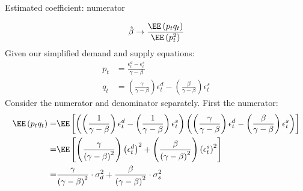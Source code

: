 \documentclass[compress, 8pt]{beamer}
\begin{document}
\begin{frame}{Estimated coefficient: numerator}

\begin{equation*}
    \hat{\beta} \rightarrow \frac{\EE\left(p_{t}q_{t}\right)}{\EE\left(p_{t}^{2}\right)}
\end{equation*}
Given our simplified demand and supply equations:
\begin{align*}
     p_t &= \frac{\epsilon_t^d - \epsilon_t^s}{\gamma - \beta} \\
    q_t &= \left(\frac{\gamma}{\gamma-\beta}\right)\epsilon_{t}^{d}-\left(\frac{\beta}{\gamma-\beta}\right)\epsilon_{t}^{s}
\end{align*}
Consider the numerator and denominator separately. First the numerator:
\begin{align*}
\EE\left(p_{t}q_{t}\right)= & \EE\left[\left(\left(\frac{1}{\gamma-\beta}\right)\epsilon_{t}^{d}-\left(\frac{1}{\gamma-\beta}\right)\epsilon_{t}^{s}\right)\left(\left(\frac{\gamma}{\gamma-\beta}\right)\epsilon_{t}^{d}-\left(\frac{\beta}{\gamma-\beta}\right)\epsilon_{t}^{s}\right)\right]\\
= & \EE\left[\left(\frac{\gamma}{\left(\gamma-\beta\right)^{2}}\right)\left(\epsilon_{t}^{d}\right)^{2}+\left(\frac{\beta}{\left(\gamma-\beta\right)^{2}}\right)\left(\epsilon_{t}^{s}\right)^{2}\right]\\
= & \frac{\gamma}{\left(\gamma-\beta\right)^{2}}\cdot\sigma_{d}^{2}+\frac{\beta}{\left(\gamma-\beta\right)^{2}}\cdot\sigma_{s}^{2}\\
\end{align*}



\end{frame}
\end{document}
